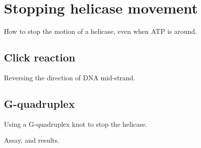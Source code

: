 \chapter{Stopping helicase movement}
\label{click_reaction_quad}

How to stop the motion of a helicase, even when ATP is around.

\section{Click reaction}

Reversing the direction of DNA mid-strand.

\section{G-quadruplex}

Using a G-quadruplex knot to stop the helicase.

Assay, and results.
